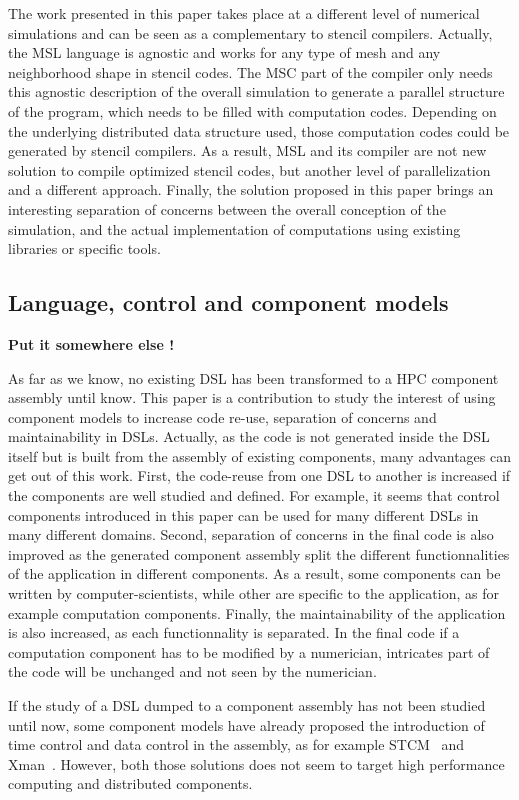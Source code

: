 The work presented in this paper takes place at a different level of numerical simulations and can be seen as a complementary to stencil compilers. Actually, the MSL language is agnostic and works for any type of mesh and any neighborhood shape in stencil codes. The MSC part of the compiler only needs this agnostic description of the overall simulation to generate a parallel structure of the program, which needs to be filled with computation codes. Depending on the underlying distributed data structure used, those computation codes could be generated by stencil compilers. As a result, MSL and its compiler are not new solution to compile optimized stencil codes, but another level of parallelization and a different approach. Finally, the solution proposed in this paper brings an interesting separation of concerns between the overall conception of the simulation, and the actual implementation of computations using existing libraries or specific tools.

\subsection{Language, control and component models}

\textbf{Put it somewhere else !}

As far as we know, no existing DSL has been transformed to a HPC component assembly until know. This paper is a contribution to study the interest of using component models to increase code re-use, separation of concerns and maintainability in DSLs. Actually, as the code is not generated inside the DSL itself but is built from the assembly of existing components, many advantages can get out of this work. First, the code-reuse from one DSL to another is increased if the components are well studied and defined. For example, it seems that control components introduced in this paper can be used for many different DSLs in many different domains. Second, separation of concerns in the final code is also improved as the generated component assembly split the different functionnalities of the application in different components. As a result, some components can be written by computer-scientists, while other are specific to the application, as for example computation components. Finally, the maintainability of the application is also increased, as each functionnality is separated. In the final code if a computation component has to be modified by a numerician, intricates part of the code will be unchanged and not seen by the numerician.

If the study of a DSL dumped to a component assembly has not been studied until now, some component models have already proposed the introduction of time control and data control in the assembly, as for example STCM~\cite{DBLP:confeuropar2008} and Xman~\cite{He12component-baseddesign}. However, both those solutions does not seem to target high performance computing and distributed components.
